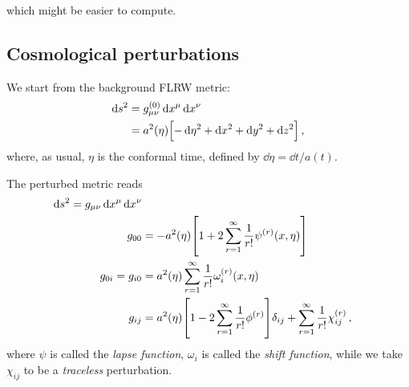 \documentclass[main.tex]{subfiles}
\begin{document}
%
%

which might be easier to compute. 

\subsection{Cosmological perturbations}

We start from the background FLRW metric: 
%
\begin{align}
\dd{s^2} &= g_{\mu \nu }^{(0)} \dd{x^{\mu }} \dd{x^{\nu }}  \\
&= a^2(\eta ) \qty[- \dd{\eta^2} + \dd{x^2} + \dd{y^2} + \dd{z^2}]
\,,
\end{align}
%
where, as usual, \(\eta \) is the conformal time, defined by \(\dd{\eta } = \dd{t} / a(t)\). 

The perturbed metric reads 
%
\begin{align}
\dd{s^2} = g_{\mu \nu } \dd{x^{\mu }} \dd{x^{\nu }}  \\
g_{00} &= - a^2(\eta ) \qty[1 + 2 \sum _{r=1}^{\infty } \frac{1}{r!} \psi^{(r)} (x, \eta )]  \\
g_{0i } = g_{i0} &= a^2(\eta ) \sum _{r=1}^{\infty } \frac{1}{r!} \omega_{i}^{(r)} (x, \eta )  \\
g_{ij } &= a^2(\eta )  \qty[1 - 2 \sum _{r=1}^{\infty } \frac{1}{r!} \phi^{(r)}] \delta_{ij} + \sum _{r=1}^{\infty } \frac{1}{r! } \chi_{ij}^{(r)}
\,,
\end{align}
%
where \(\psi\) is called the \emph{lapse function}, \(\omega_{i} \) is called the \emph{shift function}, while we take \(\chi_{ij}\) to be a \emph{traceless} perturbation.
\end{document}

